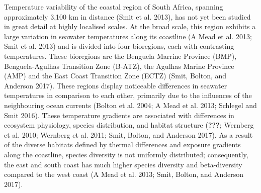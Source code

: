 \documentclass[12pt,A4paper,]{article}
\begin{document}
Temperature variability of the coastal region of South Africa, spanning
approximately 3,100 km in distance (Smit et al. 2013), has not yet been
studied in great detail at highly localised scales. At the broad scale,
this region exhibits a large variation in seawater temperatures along
its coastline (A Mead et al. 2013; Smit et al. 2013) and is divided into
four bioregions, each with contrasting temperatures. These bioregions
are the Benguela Marrine Province (BMP), Benguela-Agulhas Transition
Zone (B-ATZ), the Agulhas Marine Province (AMP) and the East Coast
Transition Zone (ECTZ) (Smit, Bolton, and Anderson 2017). These regions
display noticeable differences in seawater temperatures in comparison to
each other, primarily due to the influences of the neighbouring ocean
currents (Bolton et al. 2004; A Mead et al. 2013; Schlegel and Smit
2016). These temperature gradients are associated with differences in
ecosystem physiology, species distribution, and habitat structure
({\textbf{???}}; Wernberg et al. 2010; Wernberg et al. 2011; Smit,
Bolton, and Anderson 2017). As a result of the diverse habitats defined
by thermal differences and exposure gradients along the coastline,
species diversity is not uniformly distributed; consequently, the east
and south coast has much higher species diversity and beta-diversity
compared to the west coast (A Mead et al. 2013; Smit, Bolton, and
Anderson 2017).
\end{document}
